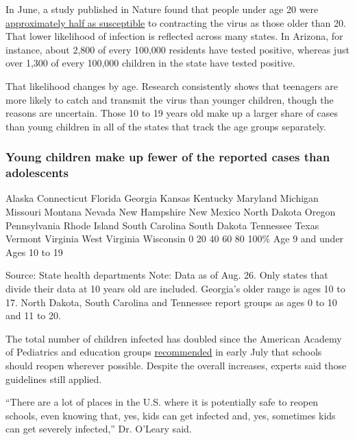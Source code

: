 In June, a study published in Nature found that people under age 20 were
\href{https://www.nature.com/articles/s41591-020-0962-9}{approximately
half as susceptible} to contracting the virus as those older than 20.
That lower likelihood of infection is reflected across many states. In
Arizona, for instance, about 2,800 of every 100,000 residents have
tested positive, whereas just over 1,300 of every 100,000 children in
the state have tested positive.

That likelihood changes by age. Research consistently shows that
teenagers are more likely to catch and transmit the virus than younger
children, though the reasons are uncertain. Those 10 to 19 years old
make up a larger share of cases than young children in all of the states
that track the age groups separately.

\hypertarget{young-children-make-up-fewer-of-the-reported-cases-than-adolescents}{%
\subsubsection{Young children make up fewer of the reported cases than
adolescents}\label{young-children-make-up-fewer-of-the-reported-cases-than-adolescents}}

Alaska Connecticut Florida Georgia Kansas Kentucky Maryland Michigan
Missouri Montana Nevada New Hampshire New Mexico North Dakota Oregon
Pennsylvania Rhode Island South Carolina South Dakota Tennessee Texas
Vermont Virginia West Virginia Wisconsin 0 20 40 60 80 100\% Age 9 and
under Ages 10 to 19

Source: State health departments \textbar{} Note: Data as of Aug. 26.
Only states that divide their data at 10 years old are included.
Georgia's older range is ages 10 to 17. North Dakota, South Carolina and
Tennessee report groups as ages 0 to 10 and 11 to 20.

The total number of children infected has doubled since the American
Academy of Pediatrics and education groups
\href{https://services.aap.org/en/news-room/news-releases/aap/2020/pediatricians-educators-and-superintendents-urge-a-safe-return-to-school-this-fall/}{recommended}
in early July that schools should reopen wherever possible. Despite the
overall increases, experts said those guidelines still applied.

``There are a lot of places in the U.S. where it is potentially safe to
reopen schools, even knowing that, yes, kids can get infected and, yes,
sometimes kids can get severely infected,'' Dr. O'Leary said.

